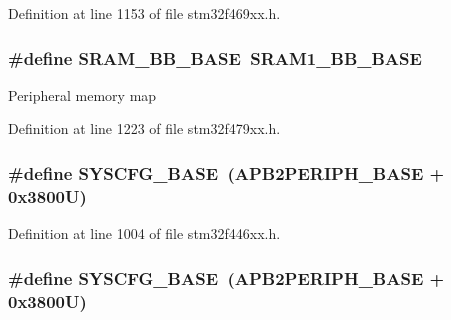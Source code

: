 Definition at line 1153 of file stm32f469xx.\+h.

\subsubsection[{\texorpdfstring{S\+R\+A\+M\+\_\+\+B\+B\+\_\+\+B\+A\+SE}{SRAM_BB_BASE}}]{\setlength{\rightskip}{0pt plus 5cm}\#define S\+R\+A\+M\+\_\+\+B\+B\+\_\+\+B\+A\+SE~{\bf S\+R\+A\+M1\+\_\+\+B\+B\+\_\+\+B\+A\+SE}}\hypertarget{group___peripheral__memory__map_gad3548b6e2f017f39d399358f3ac98454}{}\label{group___peripheral__memory__map_gad3548b6e2f017f39d399358f3ac98454}
Peripheral memory map 

Definition at line 1223 of file stm32f479xx.\+h.

\subsubsection[{\texorpdfstring{S\+Y\+S\+C\+F\+G\+\_\+\+B\+A\+SE}{SYSCFG_BASE}}]{\setlength{\rightskip}{0pt plus 5cm}\#define S\+Y\+S\+C\+F\+G\+\_\+\+B\+A\+SE~({\bf A\+P\+B2\+P\+E\+R\+I\+P\+H\+\_\+\+B\+A\+SE} + 0x3800\+U)}\hypertarget{group___peripheral__memory__map_ga62246020bf3b34b6a4d8d0e84ec79d3d}{}\label{group___peripheral__memory__map_ga62246020bf3b34b6a4d8d0e84ec79d3d}


Definition at line 1004 of file stm32f446xx.\+h.

\subsubsection[{\texorpdfstring{S\+Y\+S\+C\+F\+G\+\_\+\+B\+A\+SE}{SYSCFG_BASE}}]{\setlength{\rightskip}{0pt plus 5cm}\#define S\+Y\+S\+C\+F\+G\+\_\+\+B\+A\+SE~({\bf A\+P\+B2\+P\+E\+R\+I\+P\+H\+\_\+\+B\+A\+SE} + 0x3800\+U)}\hypertarget{group___peripheral__memory__map_ga62246020bf3b34b6a4d8d0e84ec79d3d}{}\label{group___peripheral__memory__map_ga62246020bf3b34b6a4d8d0e84ec79d3d}


